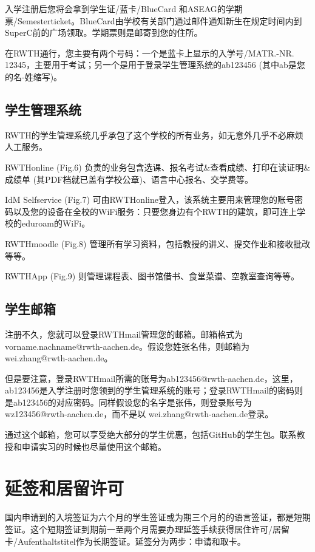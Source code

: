     入学注册后您将会拿到学生证/蓝卡/BlueCard 和ASEAG的学期票/Semesterticket。BlueCard由学校有关部门通过邮件通知新生在规定时间内到SuperC前的广场领取。学期票则是邮寄到您的住所。

    在RWTH通行，您主要有两个号码：一个是蓝卡上显示的入学号/MATR.-NR. 12345，主要用于考试；另一个是用于登录学生管理系统的ab123456 (其中ab是您的名-姓缩写)。

  \subsection{学生管理系统}\label{subsec:学生管理系统}

    RWTH的学生管理系统几乎承包了这个学校的所有业务，如无意外几乎不必麻烦人工服务。

    RWTHonline (Fig.6) 负责的业务包含选课、报名考试\&查看成绩、打印在读证明\&成绩单 (其PDF档就已盖有学校公章)、语言中心报名、交学费等。

    IdM Selfservice (Fig.7) 可由RWTHonline登入，该系统主要用来管理您的账号密码以及您的设备在全校的WiFi服务：只要您身边有个RWTH的建筑，即可连上学校的eduroam的WiFi。

    RWTHmoodle (Fig.8) 管理所有学习资料，包括教授的讲义、提交作业和接收批改等等。

    RWTHApp (Fig.9) 则管理课程表、图书馆借书、食堂菜谱、空教室查询等等。

  \subsection{学生邮箱}\label{subsec:学生邮箱}

    注册不久，您就可以登录RWTHmail管理您的邮箱。邮箱格式为 vorname.nachname@rwth-aachen.de。假设您姓张名伟，则邮箱为 wei.zhang@rwth-aachen.de。

    但是要注意，登录RWTHmail所需的账号为ab123456@rwth-aachen.de，这里，ab123456是入学注册时您领到的学生管理系统的账号；登录RWTHmail的密码则是ab123456的对应密码。同样假设您的名字是张伟，则登录账号为 wz123456@rwth-aachen.de，而不是以 wei.zhang@rwth-aachen.de登录。

    通过这个邮箱，您可以享受绝大部分的学生优惠，包括GitHub的学生包。联系教授和申请实习的时候也尽量使用这个邮箱。

\section{延签和居留许可}\label{sec:延签和居留许可}

  国内申请到的入境签证为六个月的学生签证或为期三个月的的语言签证，都是短期签证。这个短期签证到期前一至两个月需要办理延签手续获得居住许可/居留卡/Aufenthaltstitel作为长期签证。延签分为两步：申请和取卡。

